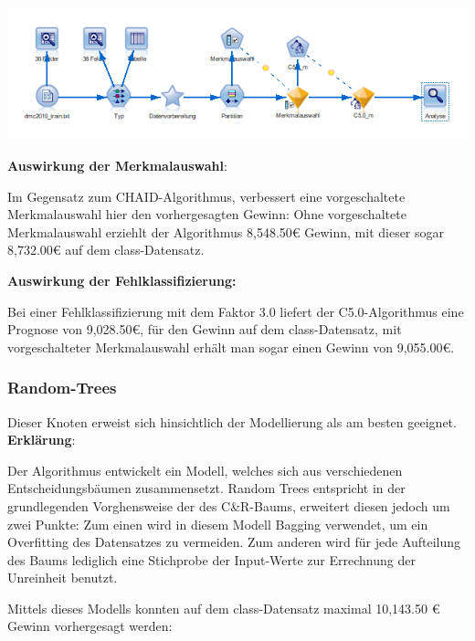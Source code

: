 \documentclass[a4paper,12pt]{article}
\newcounter{Algorithmus}
\begin{document}
\begin{center}
\includegraphics[width=\textwidth]{Screens/c50_m}
\end{center}

{\bf Auswirkung der Merkmalauswahl}:
\par
Im Gegensatz zum CHAID-Algorithmus, verbessert eine vorgeschaltete Merkmalauswahl hier den vorhergesagten Gewinn: Ohne vorgeschaltete Merkmalauswahl erziehlt der Algorithmus 8,548.50\;\euro\; Gewinn, mit dieser sogar 8,732.00\;\euro\; auf dem class-Datensatz.
\par
\vspace{0.2cm}

{\bf Auswirkung der Fehlklassifizierung:}
\par
 Bei einer Fehlklassifizierung mit dem Faktor 3.0 liefert der C5.0-Algorithmus eine Prognose von 9,028.50\;\euro,\; für den Gewinn auf dem class-Datensatz, mit vorgeschalteter Merkmalauswahl erhält man sogar einen Gewinn von 9,055.00\;\euro\;.

\subsubsection{Random-Trees}
Dieser Knoten erweist sich hinsichtlich der Modellierung als am besten geeignet.
{\bf Erklärung}:
\par
\vspace{0.2cm}
Der Algorithmus entwickelt ein Modell, welches sich aus verschiedenen Entscheidungsbäumen zusammensetzt.
Random Trees entspricht in der grundlegenden Vorghensweise der des C\&R-Baums, erweitert
diesen jedoch um zwei Punkte: Zum einen wird in diesem Modell Bagging verwendet, um
ein Overfitting des Datensatzes zu vermeiden. Zum anderen wird für jede Aufteilung des Baums
lediglich eine Stichprobe der Input-Werte zur Errechnung der Unreinheit benutzt.
\par
\vspace{0.2cm}
Mittels dieses Modells konnten auf dem class-Datensatz maximal 10,143.50 \euro\;  Gewinn vorhergesagt werden:
\end{document}
